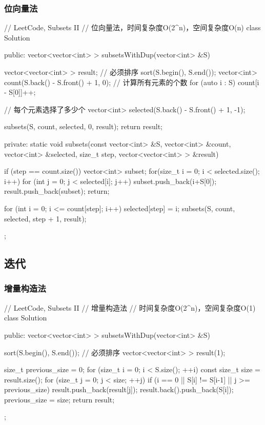 \subsubsection{位向量法}
\begin{Code}
// LeetCode, Subsets II
// 位向量法，时间复杂度O(2^n)，空间复杂度O(n)
class Solution {
public:
    vector<vector<int> > subsetsWithDup(vector<int> &S) {
        vector<vector<int> > result; // 必须排序
        sort(S.begin(), S.end());
        vector<int> count(S.back() - S.front() + 1, 0);
        // 计算所有元素的个数
        for (auto i : S) {
            count[i - S[0]]++;
        }

        // 每个元素选择了多少个
        vector<int> selected(S.back() - S.front() + 1, -1);

        subsets(S, count, selected, 0, result);
        return result;
    }

private:
    static void subsets(const vector<int> &S, vector<int> &count,
            vector<int> &selected, size_t step, vector<vector<int> > &result) {
        if (step == count.size()) {
            vector<int> subset;
            for(size_t i = 0; i < selected.size(); i++) {
                for (int j = 0; j < selected[i]; j++) {
                    subset.push_back(i+S[0]);
                }
            }
            result.push_back(subset);
            return;
        }

        for (int i = 0; i <= count[step]; i++) {
            selected[step] = i;
            subsets(S, count, selected, step + 1, result);
        }
    }
};
\end{Code}


\subsection{迭代}


\subsubsection{增量构造法}
\begin{Code}
// LeetCode, Subsets II
// 增量构造法
// 时间复杂度O(2^n)，空间复杂度O(1)
class Solution {
public:
    vector<vector<int> > subsetsWithDup(vector<int> &S) {
        sort(S.begin(), S.end()); // 必须排序
        vector<vector<int> > result(1);

        size_t previous_size = 0;
        for (size_t i = 0; i < S.size(); ++i) {
            const size_t size = result.size();
            for (size_t j = 0; j < size; ++j) {
                if (i == 0 || S[i] != S[i-1] || j >= previous_size) {
                    result.push_back(result[j]);
                    result.back().push_back(S[i]);
                }
            }
            previous_size = size;
        }
        return result;
    }
};
\end{Code}


